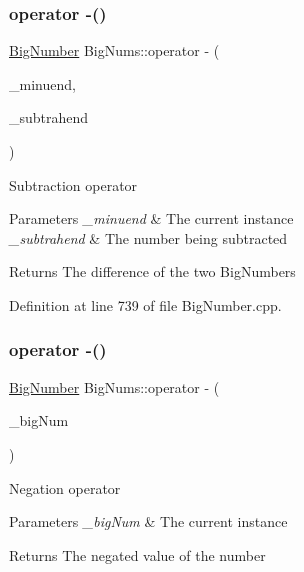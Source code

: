 \subsubsection{\texorpdfstring{operator -\/()}{operator -()}\hspace{0.1cm}{\footnotesize\ttfamily [1/2]}}
{\footnotesize\ttfamily \mbox{\hyperlink{class_big_nums_1_1_big_number}{Big\+Number}} Big\+Nums\+::operator -\/ (\begin{DoxyParamCaption}\item[{\mbox{\hyperlink{class_big_nums_1_1_big_number}{Big\+Number}}}]{\+\_\+minuend,  }\item[{const \mbox{\hyperlink{class_big_nums_1_1_big_number}{Big\+Number}} \&}]{\+\_\+subtrahend }\end{DoxyParamCaption})}

Subtraction operator 
\begin{DoxyParams}{Parameters}
{\em \+\_\+minuend} & The current instance \\
\hline
{\em \+\_\+subtrahend} & The number being subtracted \\
\hline
\end{DoxyParams}
\begin{DoxyReturn}{Returns}
The difference of the two Big\+Numbers 
\end{DoxyReturn}


Definition at line 739 of file Big\+Number.\+cpp.

\mbox{\label{namespace_big_nums_afc1c2c149134a0b2a64347c14d96946d}} 
\subsubsection{\texorpdfstring{operator -\/()}{operator -()}\hspace{0.1cm}{\footnotesize\ttfamily [2/2]}}
{\footnotesize\ttfamily \mbox{\hyperlink{class_big_nums_1_1_big_number}{Big\+Number}} Big\+Nums\+::operator -\/ (\begin{DoxyParamCaption}\item[{const \mbox{\hyperlink{class_big_nums_1_1_big_number}{Big\+Number}} \&}]{\+\_\+big\+Num }\end{DoxyParamCaption})}

Negation operator 
\begin{DoxyParams}{Parameters}
{\em \+\_\+big\+Num} & The current instance \\
\hline
\end{DoxyParams}
\begin{DoxyReturn}{Returns}
The negated value of the number 
\end{DoxyReturn}


